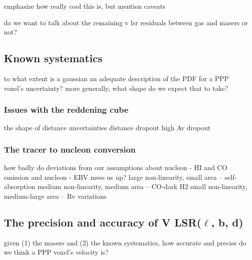 emphasize how really cool this is, but mention caveats

do we want to talk about the remaining v lsr residuals between gas and masers or not?

\subsection{Known systematics}
to what extent is a gaussian an adequate description of the PDF for a PPP voxel's uncertainty? more generally, what shape do we expect that to take?

\subsubsection{Issues with the reddening cube}
the shape of distance uncertainties
distance dropout
high Av dropout

\subsubsection{The tracer to nucleon conversion}
how badly do deviations from our assumptions about nucleon - HI and CO emission and nucleon - EBV mess us up?
large non-linearity, small area -- self-absorption
medium non-linearity, medium area -- CO-dark H2
small non-linearity, medium-large area -- Rv variations

\subsection{The precision and accuracy of V LSR($\ell$, b, d)}
given (1) the masers and (2) the known systematics, how accurate and precise do we think a PPP voxel's velocity is?